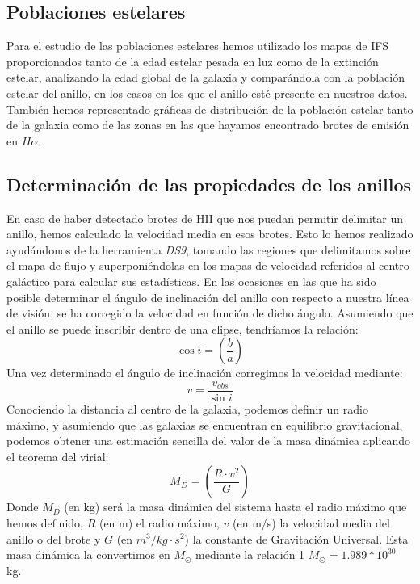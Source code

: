 \documentclass{article}
\newcommand{\hal}{$H\alpha$}
\begin{document}
\subsection{Poblaciones estelares}
Para el estudio de las poblaciones estelares hemos utilizado los mapas de IFS proporcionados tanto de la edad estelar pesada en luz como de la extinción estelar, analizando la edad global de la galaxia y comparándola con la población estelar del anillo, en los casos en los que el anillo esté presente en nuestros datos. También hemos representado gráficas de distribución de la población estelar tanto de la galaxia como de las zonas en las que hayamos encontrado brotes de emisión en \hal. 
\subsection{Determinación de las propiedades de los anillos}
En caso de haber detectado brotes de HII que nos puedan permitir delimitar un anillo, hemos calculado la velocidad media en esos brotes. Esto lo hemos realizado ayudándonos de la herramienta \emph{DS9}, tomando las regiones que delimitamos sobre el mapa de flujo y superponiéndolas en los mapas de velocidad referidos al centro galáctico para calcular sus estadísticas. 
En las ocasiones en las que ha sido posible determinar el ángulo de inclinación del anillo con respecto a nuestra línea de visión, se ha corregido la velocidad en función de dicho ángulo. Asumiendo que el anillo se puede inscribir dentro de una elipse, tendríamos la relación:
\begin{equation}
\cos i=\left(\frac{b}{a}\right) \label{ecuacion_2}
\end{equation}
Una vez determinado el ángulo de inclinación corregimos la velocidad mediante:
\begin{equation}
v=\frac{v_{obs}}{\sin i} \label{ecuacion_3}
\end{equation}
Conociendo la distancia al centro de la galaxia, podemos definir un radio máximo, y asumiendo que las galaxias se encuentran en equilibrio gravitacional, podemos obtener una estimación sencilla del valor de la masa dinámica aplicando el teorema del virial:
\begin{equation}
M_{D}=\left(\frac{R\cdot v^{2}}{G}\right) \label{ecuacion_4}
\end{equation}
Donde $M_{D}$ (en kg) será la masa dinámica del sistema hasta el radio máximo que hemos definido, $R$ (en m) el radio máximo, $v$ (en m/s) la velocidad media del anillo o del brote y $G$ (en $m^{3}/kg\cdot s^{2}$) la constante de Gravitación Universal. Esta masa dinámica la convertimos en $M_{\odot}$ mediante la relación 1 $M_{\odot} = 1.989 * 10^{30}$ kg.
\end{document}
